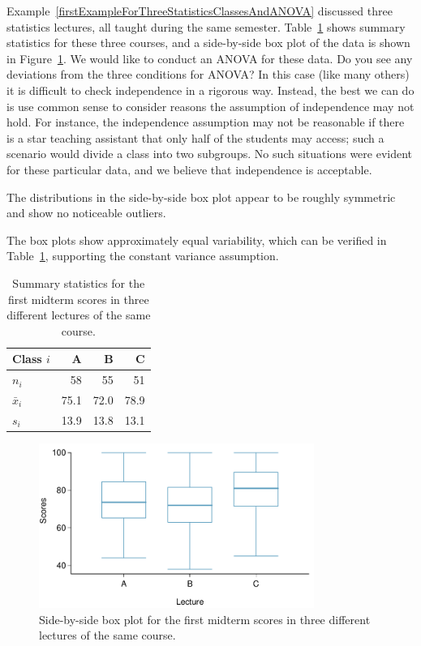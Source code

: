 \begin{example}{Example~\vref{firstExampleForThreeStatisticsClassesAndANOVA} discussed three statistics lectures, all taught during the same semester. Table~\ref{summaryStatisticsForClassTestData} shows summary statistics for these three courses, and a side-by-side box plot of the data is shown in Figure~\ref{classDataSBSBoxPlot}. We would like to conduct an ANOVA for these data. Do you see any deviations from the three conditions for ANOVA?}
In this case (like many others) it is difficult to check independence in a rigorous way. Instead, the best we can do is use common sense to consider reasons the assumption of independence may not hold. For instance, the independence assumption may not be reasonable if there is a star teaching assistant that only half of the students may access; such a scenario would divide a class into two subgroups. No such situations were evident for these particular data, and we believe that independence is acceptable.

The distributions in the side-by-side box plot appear to be roughly symmetric and show no noticeable outliers.

The box plots show approximately equal variability, which can be verified in Table~\ref{summaryStatisticsForClassTestData}, supporting the constant variance assumption.
\end{example}

\begin{table}
\centering
\begin{tabular}{lrrr}
  \hline
Class $i$	& A	& B	& C \\ 
  \hline
$n_i$		& 58	& 55	& 51 \\ 
$\bar{x}_i$	& 75.1	& 72.0	& 78.9 \\ 
$s_i$		& 13.9	& 13.8	& 13.1 \\ 
\hline
\end{tabular}
\caption{Summary statistics for the first midterm scores in three different lectures of the same course.}
\label{summaryStatisticsForClassTestData}
\end{table}

\begin{figure}
\centering
\includegraphics[width=0.8\textwidth]{05/figures/classData/classDataSBSBoxPlot}
\caption{Side-by-side box plot for the first midterm scores in three different  lectures of the same course.}
\label{classDataSBSBoxPlot}
\end{figure}


